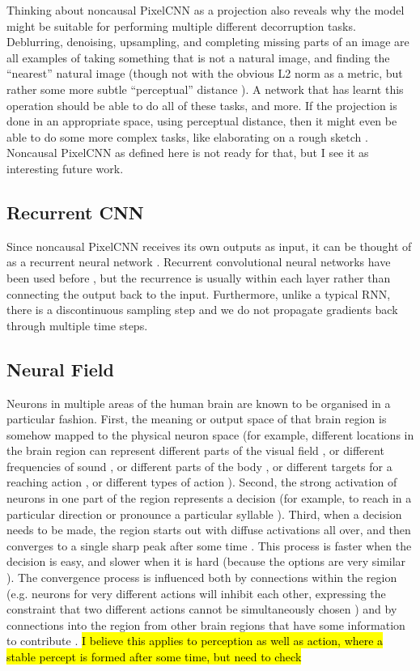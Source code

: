 \documentclass[10pt,a4paper]{article}
\newcommand{\nquote}[1]{``{#1}''}
\begin{document}
Thinking about noncausal PixelCNN as a projection also reveals why the model might be suitable for performing multiple different decorruption tasks. Deblurring, denoising, upsampling, and completing missing parts of an image are all examples of taking something that is not a natural image, and finding the \nquote{nearest} natural image (though not with the obvious L2 norm as a metric, but rather some more subtle \nquote{perceptual} distance \cite{??}). A network that has learnt this operation should be able to do all of these tasks, and more. If the projection is done in an appropriate space, using perceptual distance, then it might even be able to do some more complex tasks, like elaborating on a rough sketch \cite{??}. Noncausal PixelCNN as defined here is not ready for that, but I see it as interesting future work.

\subsection{Recurrent CNN}

Since noncausal PixelCNN receives its own outputs as input, it can be thought of as a recurrent neural network \cite{??}. Recurrent convolutional neural networks have been used before \cite{??,??}, but the recurrence is usually within each layer rather than connecting the output back to the input. Furthermore, unlike a typical RNN, there is a discontinuous sampling step and we do not propagate gradients back through multiple time steps.

\subsection{Neural Field}

Neurons in multiple areas of the human brain are known to be organised in a particular fashion. First, the meaning or output space of that brain region is somehow mapped to the physical neuron space \cite{??} (for example, different locations in the brain region can represent different parts of the visual field \cite{??}, or different frequencies of sound \cite{??}, or different parts of the body \cite{??}, or different targets for a reaching action \cite{??}, or different types of action \cite{??}). Second, the strong activation of neurons in one part of the region represents a decision \cite{??} (for example, to reach in a particular direction \cite{??} or pronounce a particular syllable \cite{??}). Third, when a decision needs to be made, the region starts out with diffuse activations all over, and then converges to a single sharp peak after some time \cite{??}. This process is faster when the decision is easy, and slower when it is hard \cite{??} (because the options are very similar \cite{??}). The convergence process is influenced both by connections within the region (e.g. neurons for very different actions will inhibit each other, expressing the constraint that two different actions cannot be simultaneously chosen \cite{??}) and by connections into the region from other brain regions that have some information to contribute \cite{??}. \hl{I believe this applies to perception as well as action, where a stable percept is formed after some time, but need to check}
\end{document}
